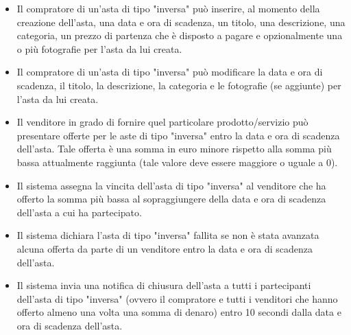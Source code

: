 \begin{itemize}
\begin{itemize}
                    \item Il compratore di un'asta di tipo "inversa" può inserire, al momento della creazione dell'asta, una data e ora di scadenza, un titolo, una descrizione, una categoria, un prezzo di partenza che è disposto a pagare e opzionalmente una o più fotografie per l'asta da lui creata.
                    \item Il compratore di un'asta di tipo "inversa" può modificare la data e ora di scadenza, il titolo, la descrizione, la categoria e le fotografie (se aggiunte) per l'asta da lui creata.
                    \item Il venditore in grado di fornire quel particolare prodotto/servizio può presentare offerte per le aste di tipo "inversa" entro la data e ora di scadenza dell'asta. Tale offerta è una somma in euro minore rispetto alla somma più bassa attualmente raggiunta (tale valore deve essere maggiore o uguale a 0).
                    \item Il sistema assegna la vincita dell'asta di tipo "inversa" al venditore che ha offerto la somma più bassa al sopraggiungere della data e ora di scadenza dell'asta a cui ha partecipato.
                    \item Il sistema dichiara l'asta di tipo "inversa" fallita se non è stata avanzata alcuna offerta da parte di un venditore entro la data e ora di scadenza dell'asta.
                    \item Il sistema invia una notifica di chiusura dell'asta a tutti i partecipanti dell'asta di tipo "inversa" (ovvero il compratore e tutti i venditori che hanno offerto almeno una volta una somma di denaro) entro 10 secondi dalla data e ora di scadenza dell'asta.
                \end{itemize}
        \end{itemize}